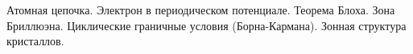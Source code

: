 \documentclass[__main__.tex]{subfiles}
\begin{document}
Атомная цепочка. Электрон в периодическом потенциале. Теорема Блоха. Зона Бриллюэна. Циклические граничные условия (Борна-Кармана). Зонная структура кристаллов.\\ 

\end{document}
